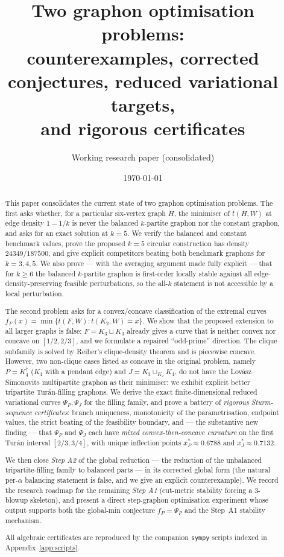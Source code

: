 \documentclass[11pt]{amsart}
\title[Two graphon optimisation problems: a consolidated progress paper]%
{Two graphon optimisation problems:\\
counterexamples, corrected conjectures, reduced variational targets,\\
and rigorous certificates}
\author{Working research paper (consolidated)}
\date{\today}
\theoremstyle{definition}
\newcommand{\1}{\mathbf 1}
\begin{document}
\begin{abstract}
This paper consolidates the current state of two graphon optimisation problems.
The first asks whether, for a particular six-vertex graph $H$, the minimiser of
$t(H,W)$ at edge density $1-1/k$ is never the balanced $k$-partite graphon nor
the constant graphon, and asks for an exact solution at $k=5$.  We verify the
balanced and constant benchmark values, prove the proposed $k=5$ circular
construction has density $24349/187500$, and give explicit competitors beating
both benchmark graphons for $k=3,4,5$.  We also prove --- with the averaging
argument made fully explicit --- that for $k\ge 6$ the balanced $k$-partite
graphon is first-order locally stable against all edge-density-preserving
feasible perturbations, so the all-$k$ statement is not accessible by a local
perturbation.

The second problem asks for a convex/concave classification of the extremal
curves $f_F(x)=\min\{t(F,W):t(K_2,W)=x\}$.  We show that the proposed extension
to all larger graphs is false: $F=K_3\sqcup K_3$ already gives a curve that is
neither convex nor concave on $[1/2,2/3]$, and we formulate a repaired
``odd-prime'' direction.  The clique subfamily is solved by Reiher's
clique-density theorem and is piecewise concave.  However, two non-clique
cases listed as concave in the original problem, namely $P=K_4^\dagger$ ($K_4$
with a pendant edge) and $J=K_3\cup_{K_2}K_4$, do not have the
Lov\'asz--Simonovits multipartite graphon as their minimiser: we exhibit
explicit better tripartite Tur\'an-filling graphons.  We derive the exact
finite-dimensional reduced variational curves $\Psi_P,\Psi_J$ for the filling
family, and prove a battery of \emph{rigorous Sturm-sequence certificates}:
branch uniqueness, monotonicity of the parametrisation, endpoint values, the
strict beating of the feasibility boundary, and --- the substantive new finding
--- that $\Psi_P$ and $\Psi_J$ each have \emph{mixed convex-then-concave
curvature} on the first Tur\'an interval $[2/3,3/4]$, with unique inflection
points $x^*_P\approx 0.6788$ and $x^*_J\approx 0.7132$.

We then close \emph{Step A2} of the global reduction --- the reduction of the
unbalanced tripartite-filling family to balanced parts --- in its corrected
global form (the natural per-$\alpha$ balancing statement is false, and we give
an explicit counterexample).  We record the research roadmap for the remaining
\emph{Step A1} (cut-metric stability forcing a $3$-blowup skeleton), and present
a direct step-graphon optimisation experiment whose output supports both the
global-min conjecture $f_P=\Psi_P$ and the Step~A1 stability mechanism.

All algebraic certificates are reproduced by the companion \texttt{sympy}
scripts indexed in Appendix~\ref{app:scripts}.
\end{abstract}
\end{document}
